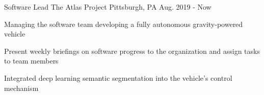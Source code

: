 

\begin{cventries}

  \cventry
    {Software Lead} %
    {The Atlas Project} %
    {Pittsburgh, PA} %
    {Aug. 2019 - Now} %
    {
      \begin{cvitems} %
		\item Managing the software team developing a fully autonomous gravity-powered vehicle
		\item Present weekly briefings on software progress to the organization and assign tasks to team members
		\item Integrated deep learning semantic segmentation into the vehicle's control mechanism
      \end{cvitems}
    }

\end{cventries}
